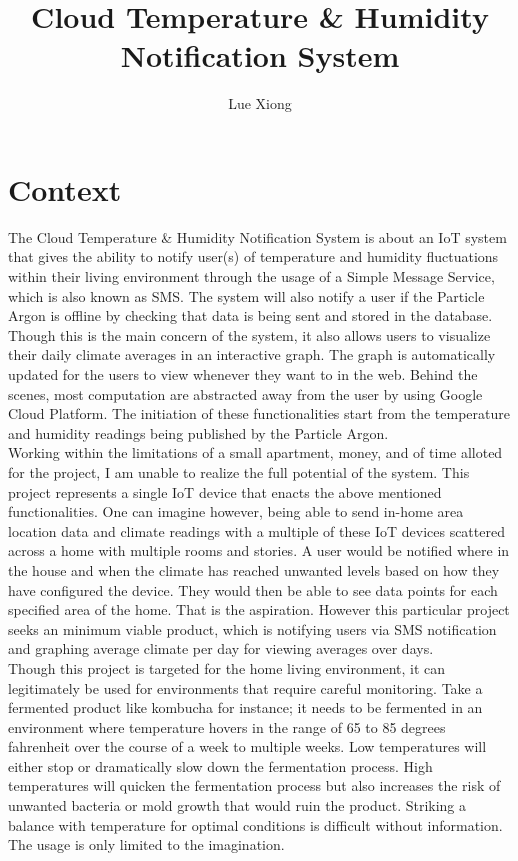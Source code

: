 \documentclass{article}
\title{Cloud Temperature \& Humidity Notification System}
\author{Lue Xiong}
\begin{document}
\maketitle
\newpage

\tableofcontents
\newpage

\obeylines

\section{Context}
The Cloud Temperature \& Humidity Notification System is about an IoT system that gives the ability to notify user(s) of temperature and humidity fluctuations within their living environment through the usage of a Simple Message Service, which is also known as SMS. The system will also notify a user if the Particle Argon is offline by checking that data is being sent and stored in the database. Though this is the main concern of the system, it also allows users to visualize their daily climate averages in an interactive graph. The graph is automatically updated for the users to view whenever they want to in the web. Behind the scenes, most computation are abstracted away from the user by using Google Cloud Platform. The initiation of these functionalities start from the temperature and humidity readings being published by the Particle Argon.\\

Working within the limitations of a small apartment, money, and of time alloted for the project, I am unable to realize the full potential of the system. This project represents a single IoT device that enacts the above mentioned functionalities. One can imagine however, being able to send in-home area location data and climate readings with a multiple of these IoT devices scattered across a home with multiple rooms and stories. A user would be notified where in the house and when the climate has reached unwanted levels based on how they have configured the device. They would then be able to see data points for each specified area of the home. That is the aspiration. However this particular project seeks an minimum viable product, which is notifying users via SMS notification and graphing average climate per day for viewing averages over days.\\

Though this project is targeted for the home living environment, it can legitimately be used for environments that require careful monitoring. Take a fermented product like kombucha for instance; it needs to be fermented in an environment where temperature hovers in the range of 65 to 85 degrees fahrenheit over the course of a week to multiple weeks. Low temperatures will either stop or dramatically slow down the fermentation process. High temperatures will quicken the fermentation process but also increases the risk of unwanted bacteria or mold growth that would ruin the product. Striking a balance with temperature for optimal conditions is difficult without information. The usage is only limited to the imagination.\\
\end{document}
